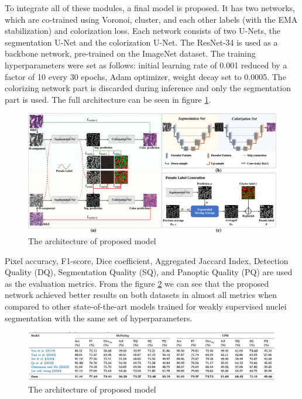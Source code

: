 To integrate all of these modules, a final model is proposed. It has two networks, which are co-trained using Voronoi, cluster, and each other labels (with the EMA stabilization) and colorization loss. Each network consists of two U-Nets, the segmentation U-Net and the colorization U-Net. The ResNet-34 is used as a backbone network, pre-trained on the ImageNet dataset. The training hyperparameters were set as follows: initial learning rate of 0.001 reduced by a factor of 10 every 30 epochs, Adam optimizer, weight decay set to 0.0005. The colorizing network part is discarded during inference and only the segmentation part is used. The full architecture can be seen in figure \ref{fig:rw-self-sup-arch}.

\begin{figure}[H]
    \begin{centering}
    \includegraphics[width=14cm]{assets/images/rw-selfsup-arch.jpg}
    \par\end{centering}
    \caption{The architecture of proposed model}
    \label{fig:rw-self-sup-arch}
\end{figure}

Pixel accuracy, F1-score, Dice coefficient, Aggregated Jaccard Index, Detection Quality (DQ), Segmentation Quality (SQ), and Panoptic Quality (PQ) are used as the evaluation metrics. From the figure \ref{fig:rw-self-sup-results} we can see that the proposed network achieved better results on both datasets in almost all metrics when compared to other state-of-the-art models trained for weakly supervised nuclei segmentation with the same set of hyperparameters.

\begin{figure}[H]
    \begin{centering}
    \includegraphics[width=14cm]{assets/images/rw-selfsup-results.png}
    \par\end{centering}
    \caption{The architecture of proposed model}
    \label{fig:rw-self-sup-results}
\end{figure}


